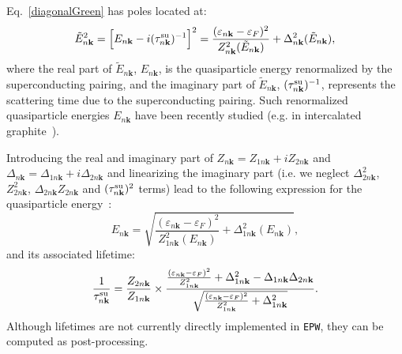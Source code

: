 \documentclass[final,3p,times,twocolumn]{elsarticle}
\begin{document}
Eq.~\eqref{diagonalGreen} has poles located at:
\begin{equation}
\tilde{E}_{n\mathbf{k}}^2 =  \Big[E_{n\mathbf{k}} -i(\tau_{n\mathbf{k}}^{\rm su})^{-1}\Big]^2 = \frac{(\varepsilon_{n\mathbf{k}}-\varepsilon_F)^2}{Z_{n\mathbf{k}}^2(\tilde{E}_{n\mathbf{k}})} +  \Delta_{n\mathbf{k}}^2(\tilde{E}_{n\mathbf{k}}), 
\end{equation}
where the real part of $\tilde{E}_{n\mathbf{k}}$, $E_{n\mathbf{k}}$, is the quasiparticle energy renormalized by the superconducting pairing, and   the imaginary part of  $\tilde{E}_{n\mathbf{k}}$, $(\tau_{n\mathbf{k}}^{\rm su})^{-1}$, represents the scattering time due to  the superconducting pairing.
Such renormalized quasiparticle energies  $E_{n\mathbf{k}}$ have been recently studied (e.g. in intercalated graphite~\cite{Sanna2012}).
%

Introducing the real and imaginary part of $Z_{n\mathbf{k}}=Z_{1n\mathbf{k}}+iZ_{2n\mathbf{k}}$ and $\Delta_{n\mathbf{k}}=\Delta_{1n\mathbf{k}}+i\Delta_{2n\mathbf{k}}$ and linearizing the imaginary part (i.e. we neglect $\Delta_{2n\mathbf{k}}^2$, $Z_{2n\mathbf{k}}^2$, $\Delta_{2n\mathbf{k}}Z_{2n\mathbf{k}}$ and $(\tau_{n\mathbf{k}}^{\rm su})^2$ terms) lead to the following expression for the quasiparticle energy~\cite{Kaplan1976,Marsiglio1997,Marsiglio1997a}: 
\begin{equation}\label{gapequation}
E_{n\mathbf{k}} = \sqrt{\frac{(\varepsilon_{n\mathbf{k}}-\varepsilon_F)^2}{Z_{1n\mathbf{k}}^2(E_{n\mathbf{k}})}+\Delta_{1n\mathbf{k}}^2(E_{n\mathbf{k}})},
\end{equation}
and its associated lifetime:
\begin{equation}
\frac{1}{\tau_{n\mathbf{k}}^{\rm su}} = \frac{Z_{2n\mathbf{k}}}{Z_{1n\mathbf{k}}}\times \frac{\frac{(\varepsilon_{n\mathbf{k}}-\varepsilon_F)^2}{Z_{1n\mathbf{k}}^2}+\Delta_{1n\mathbf{k}}^2-\Delta_{1n\mathbf{k}}\Delta_{2n\mathbf{k}}}{\sqrt{\frac{(\varepsilon_{n\mathbf{k}}-\varepsilon_F)^2}{Z_{1n\mathbf{k}}^2}+\Delta_{1n\mathbf{k}}^2}}.
\end{equation}
Although lifetimes are not currently directly implemented in \texttt{EPW}, they can be computed as post-processing. 
\end{document}
